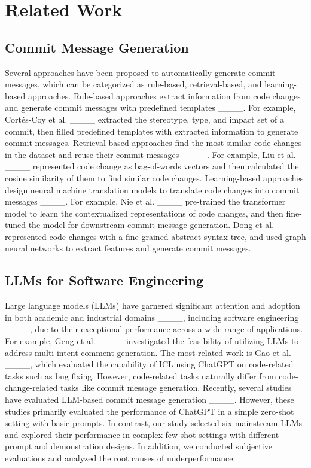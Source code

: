 \section{Related Work}
\subsection{Commit Message Generation}
Several approaches have been proposed to automatically generate commit messages, which can be categorized as rule-based, retrieval-based, and learning-based approaches.
Rule-based approaches extract information from code changes and generate commit messages with predefined templates ____. For example, Cortés-Coy et al. ____ extracted the stereotype, type, and impact set of a commit, then filled predefined templates with extracted information to generate commit messages.
Retrieval-based approaches find the most similar code changes in the dataset and reuse their commit messages ____. For example, Liu et al. ____ represented code change as bag-of-words vectors and then calculated the cosine similarity of them to find similar code changes.
Learning-based approaches design neural machine translation models to translate code changes into commit messages ____.
For example,
Nie et al. ____ pre-trained the transformer model to learn the contextualized representations of code changes, and then fine-tuned the model for downstream commit message generation.
Dong et al. ____ represented code changes with a fine-grained abstract syntax tree, and used graph neural networks to extract features and generate commit messages.

\subsection{LLMs for Software Engineering}
Large language models (LLMs) have garnered significant attention and adoption in both academic and industrial domains ____, including software engineering ____, due to their exceptional performance across a wide range of applications. 
For example, Geng et al. ____ investigated the feasibility of utilizing LLMs to address multi-intent comment generation.
The most related work is Gao et al. ____, which evaluated the capability of ICL using ChatGPT on code-related tasks such as bug fixing. However, code-related tasks naturally differ from code-change-related tasks like commit message generation.
Recently, several studies have evaluated LLM-based commit message generation ____.
However, these studies primarily evaluated the performance of ChatGPT in a simple zero-shot setting with basic prompts. In contrast, our study selected six mainstream LLMs and explored their performance in complex few-shot settings with different prompt and demonstration designs. In addition, we conducted subjective evaluations and analyzed the root causes of underperformance.